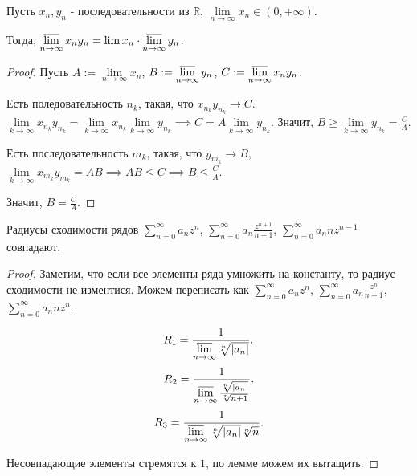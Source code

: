 \begin{lemma} \thmslashn

    Пусть $x_{n}, y_{n}$ - последовательности из $\mathbb{R}$, $\lim\limits_{n \to \infty} x_{n}\in (0, +\infty)$.

    Тогда, $\varlimsup\limits_{n \to \infty} x_{n}y_{n} = \lim x_{n} \cdot \varlimsup\limits_{n\to \infty} y_{n}$.
    \begin{proof} \thmslashn
    
        Пусть $A := \lim\limits_{n \to \infty} x_{n}$, $B := \varlimsup\limits_{n\to \infty} y_{n}$, $C := \varlimsup\limits_{n \to \infty} x_{n}y_{n}$.

        Есть поледовательность $n_{k}$, такая, что $x_{n_{k}}y_{n_{k}} \to C$. $\lim\limits_{k \to \infty} x_{n_{k}}y_{n_{k}} = \lim\limits_{k \to \infty} x_{n_{k}} \lim\limits_{k \to \infty} y_{n_{k}} \implies C = A \lim\limits_{k \to \infty} y_{n_{k}}$. Значит, $B \ge \lim\limits_{k \to \infty} y_{n_{k}} = \frac{C}{A}$.

        Есть последовательность $m_{k}$, такая, что $y_{m_{k}} \to B$, $\lim\limits_{k \to \infty} x_{m_{k}}y_{m_{k}} = AB \implies AB \le C \implies B \le \frac{C}{A}$.

        Значит, $B = \frac{C}{A}$.
    \end{proof}
\end{lemma}
\begin{consequence} \thmslashn

    Радиусы сходимости рядов $\sum\limits_{n=0}^{\infty} a_{n}z^{n}$, $\sum\limits_{n=0}^{\infty} a_{n} \frac{z^{n+1}}{n+1}$, $\sum\limits_{n=0}^{\infty} a_{n}n z^{n-1}$ совпадают.
    \begin{proof} \thmslashn
    
        Заметим, что если все элементы ряда умножить на константу, то радиус сходимости не изментися. Можем переписать как $\sum\limits_{n=0}^{\infty} a_{n}z^{n}$, $\sum\limits_{n=0}^{\infty} a_{n} \frac{z^{n}}{n+1}$, $\sum\limits_{n=0}^{\infty} a_{n}nz^{n}$.

        \[ R_1 = \frac{1}{\varlimsup\limits_{n\to \infty} \sqrt[n]{ |a_{n}| } } .\] 
        \[ R_2 = \frac{1}{\varlimsup\limits_{n\to \infty} \frac{\sqrt[n]{ |a_{n}| }}{\sqrt[n]{n+1} }} .\] 
        \[ R_3 = \frac{1}{\varlimsup\limits_{n\to \infty} \sqrt[n]{ |a_{n}|}\sqrt[n]{n} } .\]

        Несовпадающие элементы стремятся к $1$, по лемме можем их вытащить.
    \end{proof}
\end{consequence}
